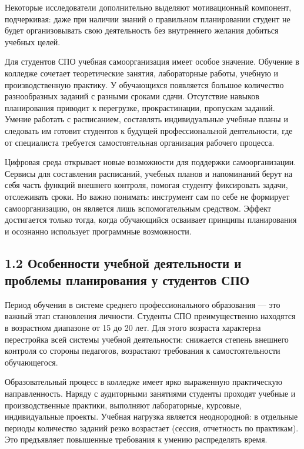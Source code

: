 \documentclass[
]{article}
\begin{document}
Некоторые исследователи дополнительно выделяют мотивационный компонент,
подчеркивая: даже при наличии знаний о правильном планировании студент
не будет организовывать свою деятельность без внутреннего желания
добиться учебных целей.

Для студентов СПО учебная самоорганизация имеет особое значение.
Обучение в колледже сочетает теоретические занятия, лабораторные работы,
учебную и производственную практику. У обучающихся появляется большое
количество разнообразных заданий с разными сроками сдачи. Отсутствие
навыков планирования приводит к перегрузке, прокрастинации, пропускам
заданий. Умение работать с расписанием, составлять индивидуальные
учебные планы и следовать им готовит студентов к будущей
профессиональной деятельности, где от специалиста требуется
самостоятельная организация рабочего процесса.

Цифровая среда открывает новые возможности для поддержки
самоорганизации. Сервисы для составления расписаний, учебных планов и
напоминаний берут на себя часть функций внешнего контроля, помогая
студенту фиксировать задачи, отслеживать сроки. Но важно понимать:
инструмент сам по себе не формирует самоорганизацию, он является лишь
вспомогательным средством. Эффект достигается только тогда, когда
обучающийся осваивает принципы планирования и осознанно использует
программные возможности.

\subsection{\texorpdfstring{\textbf{1.2 Особенности учебной деятельности
и проблемы планирования у студентов
СПО}}{1.2 Особенности учебной деятельности и проблемы планирования у студентов СПО}}\label{ux43eux441ux43eux431ux435ux43dux43dux43eux441ux442ux438-ux443ux447ux435ux431ux43dux43eux439-ux434ux435ux44fux442ux435ux43bux44cux43dux43eux441ux442ux438-ux438-ux43fux440ux43eux431ux43bux435ux43cux44b-ux43fux43bux430ux43dux438ux440ux43eux432ux430ux43dux438ux44f-ux443-ux441ux442ux443ux434ux435ux43dux442ux43eux432-ux441ux43fux43e}

Период обучения в системе среднего профессионального образования --- это
важный этап становления личности. Студенты СПО преимущественно находятся
в возрастном диапазоне от 15 до 20 лет. Для этого возраста характерна
перестройка всей системы учебной деятельности: снижается степень
внешнего контроля со стороны педагогов, возрастают требования к
самостоятельности обучающегося.

Образовательный процесс в колледже имеет ярко выраженную практическую
направленность. Наряду с аудиторными занятиями студенты проходят учебные
и производственные практики, выполняют лабораторные, курсовые,
индивидуальные проекты. Учебная нагрузка является неоднородной: в
отдельные периоды количество заданий резко возрастает (сессия,
отчетность по практикам). Это предъявляет повышенные требования к умению
распределять время.
\end{document}
